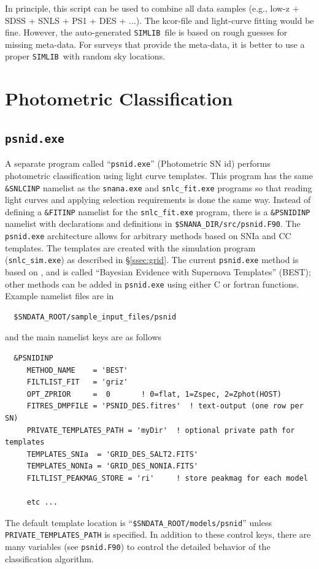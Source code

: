 \documentclass[12pt]{article}
\newcommand{\snfitter}{{\tt snlc\_fit.exe}}
\newcommand{\simexe}{{\tt snlc\_sim.exe}}
\newcommand{\psnid}{{\tt psnid.exe}}
\newcommand{\simlib}{{\tt SIMLIB}}
\begin{document}
In principle, this script can be used to combine all data 
samples (e.g., low-z + SDSS + SNLS + PS1 + DES + ...).
The kcor-file and light-curve fitting would be fine. 
However, the auto-generated \simlib\ file is based on rough
guesses for missing meta-data. For surveys that provide
the meta-data, it is better to use a proper \simlib\
with random sky locations.


   \clearpage
   \section{Photometric Classification }
   \label{sec:photid}


\subsection{\psnid}
\label{subsec:psnid}

A separate program called ``{\psnid}''  (Photometric SN id) 
performs photometric classification using light curve templates.
This program has the same {\tt \&SNLCINP} namelist as
the {\tt snana.exe} and {\snfitter} programs so that
reading light curves and applying selection requirements
is done the same way. Instead of defining a {\tt\&FITINP} namelist
for the {\snfitter} program, there is a {\tt\&PSNIDINP}
namelist with declarations and definitions in
{\tt \$SNANA\_DIR/src/psnid.F90}.
The {\psnid} architecture allows for arbitrary methods based 
on SNIa and CC templates. The templates are created with the 
simulation program ({\simexe}) as described in \S\ref{ssec:grid}.
The current {\psnid} method is based on \cite{PSNID_2011},
and is called 
``Bayesian Evidence with Supernova Templates'' (BEST);
other methods can be added in {\psnid} using either
C or fortran functions.
Example namelist files are in
\begin{verbatim}
  $SNDATA_ROOT/sample_input_files/psnid
\end{verbatim}
%
and the main namelist keys are as follows
\begin{verbatim}
  &PSNIDINP
     METHOD_NAME    = 'BEST'
     FILTLIST_FIT   = 'griz'
     OPT_ZPRIOR     =  0       ! 0=flat, 1=Zspec, 2=Zphot(HOST)
     FITRES_DMPFILE = 'PSNID_DES.fitres'  ! text-output (one row per SN)
     PRIVATE_TEMPLATES_PATH = 'myDir'  ! optional private path for templates
     TEMPLATES_SNIa  = 'GRID_DES_SALT2.FITS'
     TEMPLATES_NONIa = 'GRID_DES_NONIA.FITS'
     FILTLIST_PEAKMAG_STORE = 'ri'     ! store peakmag for each model

     etc ...
\end{verbatim}
The default template location is ``{\tt \$SNDATA\_ROOT/models/psnid}''
unless {\tt PRIVATE\_TEMPLATES\_PATH} is specified.
In addition to these control keys, there are many variables 
(see {\tt psnid.F90}) to control the detailed behavior
of the classification algorithm.
\end{document}
